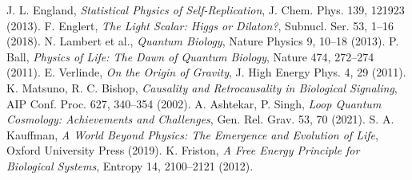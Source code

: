 \documentclass[12pt,a4paper]{article}
\begin{document}
\begin{thebibliography}{99}
		 J. L. England, \textit{Statistical Physics of Self-Replication}, J. Chem. Phys. 139, 121923 (2013).
		 F. Englert, \textit{The Light Scalar: Higgs or Dilaton?}, Subnucl. Ser. 53, 1--16 (2018).
		 N. Lambert et al., \textit{Quantum Biology}, Nature Physics 9, 10--18 (2013).
		 P. Ball, \textit{Physics of Life: The Dawn of Quantum Biology}, Nature 474, 272--274 (2011).
		 E. Verlinde, \textit{On the Origin of Gravity}, J. High Energy Phys. 4, 29 (2011).
		 K. Matsuno, R. C. Bishop, \textit{Causality and Retrocausality in Biological Signaling}, AIP Conf. Proc. 627, 340--354 (2002).
		 A. Ashtekar, P. Singh, \textit{Loop Quantum Cosmology: Achievements and Challenges}, Gen. Rel. Grav. 53, 70 (2021).
		 S. A. Kauffman, \textit{A World Beyond Physics: The Emergence and Evolution of Life}, Oxford University Press (2019).
		 K. Friston, \textit{A Free Energy Principle for Biological Systems}, Entropy 14, 2100--2121 (2012).
	\end{thebibliography}
\end{document}

